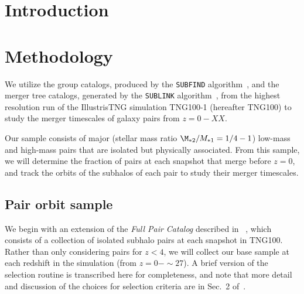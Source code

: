 \documentclass[twocolumn,linenumbers]{aastex631}
\newcommand{\paircat}{\textit{Full Pair Catalog}}
\begin{document}
\section{Introduction} \label{sec:intro}




\section{Methodology}
We utilize the group catalogs, produced by the \texttt{SUBFIND} algorithm~\citep{Springel2001,Dolag2009}, and the merger tree catalogs, generated by the \texttt{SUBLINK} algorithm~\citep{RG2015}, from the highest resolution run of the IllustrisTNG simulation TNG100-1 (hereafter TNG100) to study the merger timescales of galaxy pairs from $z=0-XX$.

Our sample consists of major (stellar mass ratio $\M_{*2}/M_{*1}= 1/4 - 1$) low-mass and high-mass pairs that are isolated but physically associated.
From this sample, we will determine the fraction of pairs at each snapshot that merge before $z=0$, and track the orbits of the subhalos of each pair to study their merger timescales.

\subsection{Pair orbit sample}
We begin with an extension of the \paircat{} described in ~\citet{Chamberlain2024}, which consists of a collection of isolated subhalo pairs at each snapshot in TNG100. 
Rather than only considering pairs for $z<4$, we will collect our base sample at each redshift in the simulation (from $z=0-\sim 27$). 
A brief version of the selection routine is transcribed here for completeness, and note that more detail and discussion of the choices for selection criteria are in Sec.~2 of~\citet{Chamberlain2024}. 
\end{document}
